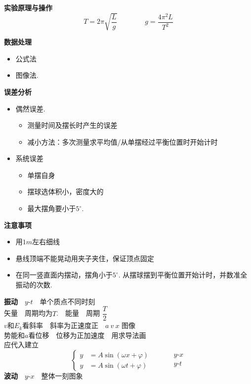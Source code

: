 \textbf{实验原理与操作}
\[ T=2\pi\sqrt{\frac{L}{g}}\qquad\qquad g=\frac{4\pi^{2}L}{T^{2}} \]

\textbf{数据处理}
\begin{itemize}
\item 公式法
\item 图像法.
\end{itemize}

\textbf{误差分析}
\begin{itemize}
\item 偶然误差.
 \begin{itemize}
 \item 测量时间及摆长时产生的误差
 \item 减小方法：多次测量求平均值/从单摆经过平衡位置时开始计时
 \end{itemize}
\item 系统误差
 \begin{itemize}
 \item 单摆自身
 \item 摆球选体积小，密度大的
 \item 最大摆角要小于$5^\circ$.
 \end{itemize}
\end{itemize}

\textbf{注意事项}
\begin{itemize}
\item 用$1\unit{m}$左右细线
\item 悬线顶端不能晃动用夹子夹住，保证顶点固定
\item 在同一竖直面内摆动，摆角小于$5^\circ$. 从摆球摆到平衡位置开始计时，并数准全振动的次数.
\end{itemize}
\textbf{振动}　$y$-$t$　单个质点不同时刻\\
\hspace*{1em}矢量　周期均为$T$.　能量　周期 $\dfrac{T}{2}$\\
\hspace*{1em}$v$和$E_k$看斜率　斜率为正速度正　$a\ v\ x$ 图像\\
\hspace*{1em}势能和$a$看位移　位移为正加速度　用求导法画\\
\hspace*{1em}应代入建立
\[
\left\{\begin{aligned}
y&=A\sin(\omega x+\varphi)\\
y&=A\sin(\omega t+\varphi)
\end{aligned}\right.
\qquad
\begin{aligned}
&y\text{-}x\\
&y\text{-}t
\end{aligned}
\]
\textbf{波动}　$y$-$x$　整体一刻图象

